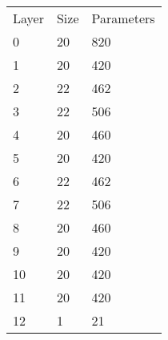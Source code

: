 \begin{tabular}{lll}
\toprule
 Layer & Size & Parameters \\
 0     & 20   & 820        \\
 1     & 20   & 420        \\
 2     & 22   & 462        \\
 3     & 22   & 506        \\
 4     & 20   & 460        \\
 5     & 20   & 420        \\
 6     & 22   & 462        \\
 7     & 22   & 506        \\
 8     & 20   & 460        \\
 9     & 20   & 420        \\
 10    & 20   & 420        \\
 11    & 20   & 420        \\
 12    & 1    & 21         \\
\bottomrule
\end{tabular}%

